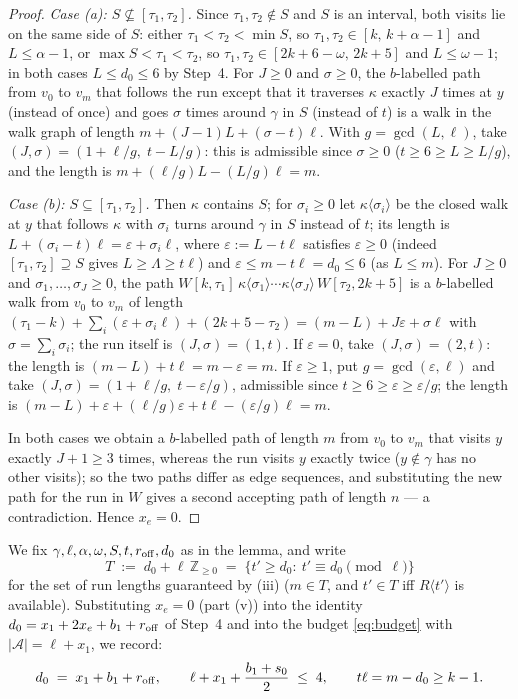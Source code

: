 \documentclass[11pt]{article}
\theoremstyle{definition}
\newcommand{\Z}{\mathbb{Z}}
\begin{document}
\begin{proof}
\emph{Case (a): $S\not\subseteq[\tau_1,\tau_2]$.} Since $\tau_1,\tau_2\notin
S$ and $S$ is an interval, both visits lie on the same side of $S$: either
$\tau_1<\tau_2<\min S$, so $\tau_1,\tau_2\in[k,\,k+\alpha-1]$ and
$L\le\alpha-1$, or $\max S<\tau_1<\tau_2$, so
$\tau_1,\tau_2\in[2k+6-\omega,\,2k+5]$ and $L\le\omega-1$; in both cases
$L\le d_0\le6$ by Step~4. For $J\ge0$ and $\sigma\ge0$, the $b$-labelled
path from $v_0$ to $v_m$ that follows the run except that it traverses
$\kappa$ exactly $J$ times at $y$ (instead of once) and goes $\sigma$ times
around $\gamma$ in $S$ (instead of $t$) is a walk in the walk graph of
length $m+(J-1)L+(\sigma-t)\ell$. With $g=\gcd(L,\ell)$, take
$(J,\sigma)=(1+\ell/g,\;t-L/g)$: this is admissible since $\sigma\ge0$
($t\ge6\ge L\ge L/g$), and the length is
$m+(\ell/g)L-(L/g)\ell=m$.

\emph{Case (b): $S\subseteq[\tau_1,\tau_2]$.} Then $\kappa$ contains $S$;
for $\sigma_i\ge0$ let $\kappa\langle\sigma_i\rangle$ be the closed walk at
$y$ that follows $\kappa$ with $\sigma_i$ turns around $\gamma$ in $S$
instead of $t$; its length is $L+(\sigma_i-t)\ell=\varepsilon+\sigma_i\ell$,
where $\varepsilon:=L-t\ell$ satisfies $\varepsilon\ge0$ (indeed
$[\tau_1,\tau_2]\supseteq S$ gives $L\ge\Lambda\ge t\ell$) and
$\varepsilon\le m-t\ell=d_0\le6$ (as $L\le m$). For $J\ge0$ and
$\sigma_1,\dots,\sigma_J\ge0$, the path
$W[k,\tau_1]\,\kappa\langle\sigma_1\rangle\cdots\kappa\langle\sigma_J\rangle\,
W[\tau_2,2k+5]$ is a $b$-labelled walk from $v_0$ to $v_m$ of length
$(\tau_1-k)+\sum_i(\varepsilon+\sigma_i\ell)+(2k+5-\tau_2)
=(m-L)+J\varepsilon+\sigma\ell$ with $\sigma=\sum_i\sigma_i$; the run
itself is $(J,\sigma)=(1,t)$. If $\varepsilon=0$, take $(J,\sigma)=(2,t)$:
the length is $(m-L)+t\ell=m-\varepsilon=m$. If $\varepsilon\ge1$, put
$g=\gcd(\varepsilon,\ell)$ and take
$(J,\sigma)=(1+\ell/g,\;t-\varepsilon/g)$, admissible since
$t\ge6\ge\varepsilon\ge\varepsilon/g$; the length is
$(m-L)+\varepsilon+ (\ell/g)\varepsilon+t\ell-(\varepsilon/g)\ell=m$.

In both cases we obtain a $b$-labelled path of length $m$ from $v_0$ to
$v_m$ that visits $y$ exactly $J+1\ge3$ times, whereas the run visits $y$
exactly twice ($y\notin\gamma$ has no other visits); so the two paths
differ as edge sequences, and substituting the new path for the run in $W$
gives a second accepting path of length $n$ --- a contradiction. Hence
$x_e=0$.
\end{proof}


We fix $\gamma,\ell,\alpha,\omega,S,t,r_{\rm off},d_0$ as in the lemma, and
write
\[
T\;:=\;d_0+\ell\,\Z_{\ge0}\;=\;\{t'\ge d_0:\ t'\equiv d_0\pmod\ell\}
\]
for the set of run lengths guaranteed by (iii) ($m\in T$, and $t'\in T$ iff
$R\langle t'\rangle$ is available). Substituting $x_e=0$ (part (v)) into the
identity $d_0=x_1+2x_e+b_1+r_{\rm off}$ of Step~4 and into the budget
\eqref{eq:budget} with $|\mathcal A|=\ell+x_1$, we record:
\begin{equation}\label{eq:dzero}
d_0\;=\;x_1+b_1+r_{\rm off},\qquad
\ell+x_1+\frac{b_1+s_0}{2}\;\le\;4,\qquad
t\ell=m-d_0\ge k-1 .
\end{equation}
\end{document}
